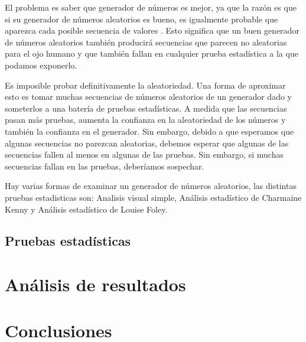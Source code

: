 El problema es saber que generador de números es mejor, ya que la razón es que si su generador de números aleatorios es bueno, es igualmente probable que aparezca cada posible secuencia de valores . Esto significa que un buen generador de números aleatorios también producirá secuencias que parecen no aleatorias para el ojo humano y que también fallan en cualquier prueba estadística a la que podamos exponerlo. 


Es imposible probar definitivamente la aleatoriedad. Una forma de aproximar esto es tomar muchas secuencias de números aleatorios de un generador dado y someterlos a una batería de pruebas estadísticas. A medida que las secuencias pasan más pruebas, aumenta la confianza en la aleatoriedad de los números y también la confianza en el generador. Sin embargo, debido a que esperamos que algunas secuencias no parezcan aleatorias, debemos esperar que algunas de las secuencias fallen al menos en algunas de las pruebas. Sin embargo, si muchas secuencias fallan en las pruebas, deberíamos sospechar.

Hay varias formas de examinar un generador de números aleatorios, las distintas pruebas estadisticas son: Analisis visual simple, Análisis estadístico de Charmaine Kenny y Análisis estadístico de Louise Foley.
 
\subsection{Pruebas estadísticas}





\section{Análisis de resultados}


\section{Conclusiones}
